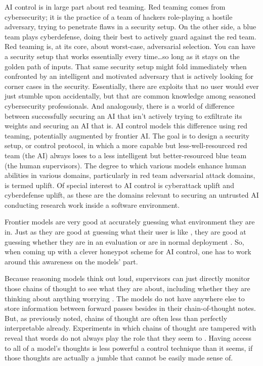 AI control is in large part about red teaming. Red teaming comes from
cybersecurity; it is the practice of a team of hackers role-playing a hostile
adversary, trying to penetrate flaws in a security setup. On the other side, a
blue team plays cyberdefense, doing their best to actively guard against the
red team. Red teaming is, at its core, about worst-case, adversarial selection.
You can have a security setup that works essentially every time\ldots so long
as it stays on the golden path of inputs. That same security setup might fold
immediately when confronted by an intelligent and motivated adversary that is
actively looking for corner cases in the security. Essentially, there are
exploits that no user would ever just stumble upon accidentally, but that are
common knowledge among seasoned cybersecurity professionals. And analogously,
there is a world of difference between successfully securing an AI that isn't
actively trying to exfiltrate its weights and securing an AI that is. AI
control models this difference using red teaming, potentially augmented by
frontier AI. The goal is to design a security setup, or control protocol, in
which a more capable but less-well-resourced red team (the AI) always loses to
a less intelligent but better-resourced blue team (the human supervisors). The
degree to which various models enhance human abilities in various domains,
particularly in red team adversarial attack domains, is termed uplift. Of
special interest to AI control is cyberattack uplift and cyberdefense uplift,
as these are the domains relevant to securing an untrusted AI conducting
research work inside a software environment.

Frontier models are very good at accurately guessing what environment they are
in. Just as they are good at guessing what their user is like
\cite{derner2024truesight}, they are good at guessing whether they are in an
evaluation or are in normal deployment \cite{needham2025know}. So, when coming
up with a clever honeypot scheme for AI control, one has to work around this
awareness on the models' part.

Because reasoning models think out loud, supervisors can just directly monitor
those chains of thought to see what they are about, including whether they are
thinking about anything worrying \cite{baker2025monitoring}. The models do not
have anywhere else to store information between forward passes besides in their
chain-of-thought notes. But, as previously noted, chains of thought are often
less than perfectly interpretable already. Experiments in which chains of
thought are tampered with reveal that words do not always play the role that
they seem to \cite{}. Having access to all of a model's thoughts is less
powerful a control technique than it seems, if those thoughts are actually a
jumble that cannot be easily made sense of.

